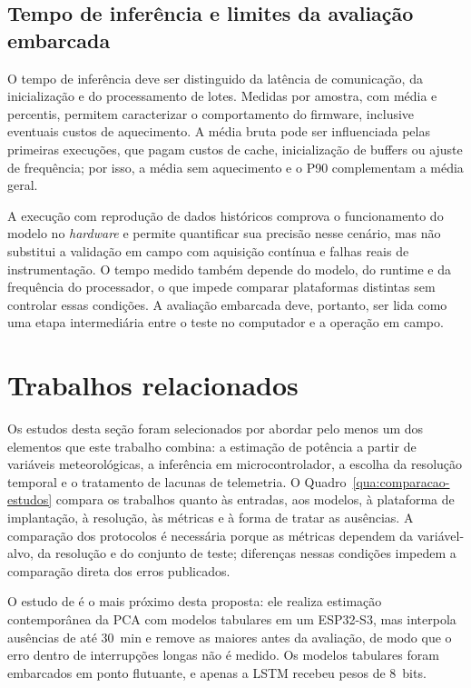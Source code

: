 \subsection{Tempo de inferência e limites da avaliação embarcada}
\label{subsec:ft-latencia}

O tempo de inferência deve ser distinguido da latência de comunicação,
da inicialização e do processamento de lotes. Medidas por amostra, com
média e percentis, permitem caracterizar o comportamento do firmware,
inclusive eventuais custos de aquecimento. A média bruta pode ser
influenciada pelas primeiras execuções, que pagam custos de cache,
inicialização de buffers ou ajuste de frequência; por isso, a média sem
aquecimento e o P90 complementam a média geral.

A execução com reprodução de dados históricos comprova o funcionamento
do modelo no \textit{hardware} e permite quantificar sua precisão nesse cenário,
mas não substitui a validação em campo com aquisição contínua e falhas
reais de instrumentação. O tempo medido também depende do modelo, do
runtime e da frequência do processador, o que impede comparar plataformas
distintas sem controlar essas condições. A avaliação embarcada deve,
portanto, ser lida como uma etapa intermediária entre o teste no
computador e a operação em campo.

\section{Trabalhos relacionados}
\label{sec:ft-relacionados}

Os estudos desta seção foram selecionados por abordar pelo menos um dos
elementos que este trabalho combina: a estimação de potência a partir de
variáveis meteorológicas, a inferência em microcontrolador, a escolha da
resolução temporal e o tratamento de lacunas de telemetria. O
Quadro~\ref{qua:comparacao-estudos} compara os trabalhos quanto às entradas,
aos modelos, à plataforma de implantação, à resolução, às métricas e à forma
de tratar as ausências. A comparação dos protocolos é necessária porque as
métricas dependem da variável-alvo, da resolução e do conjunto de teste;
diferenças nessas condições impedem a comparação direta dos erros publicados.

O estudo de  é o mais próximo desta proposta: ele
realiza estimação contemporânea da PCA com modelos tabulares em um ESP32-S3,
mas interpola ausências de até 30~min e remove as maiores antes da avaliação,
de modo que o erro dentro de interrupções longas não é medido. Os modelos
tabulares foram embarcados em ponto flutuante, e apenas a LSTM recebeu pesos
de 8~bits.

